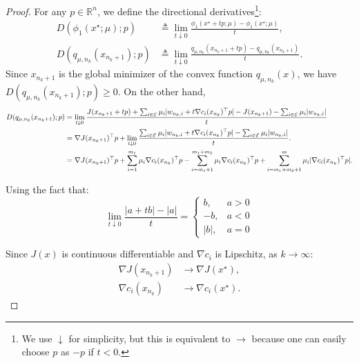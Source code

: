 \begin{proof}
    For any \( p \in \mathbb{R}^n \), we define the directional derivatives\footnote{We use $\downarrow$ for simplicity, but this is equivalent to $\rightarrow$ because one can easily choose $p$ as $-p$ if $t < 0$.}:
    \begin{align}
        D(\phi_1(x^\star;\mu);p) &\triangleq \lim_{t \downarrow 0} \frac{\phi_1(x^\star + tp;\mu) - \phi_1(x^\star;\mu)}{t}, \\
        D(q_{\mu,n_k}(x_{n_{k}+1});p) &\triangleq \lim_{t \downarrow 0} \frac{q_{\mu,n_k}(x_{n_{k}+1} + tp) - q_{\mu,n_k}(x_{n_{k}+1})}{t}.
    \end{align}
    Since $x_{n_k+1}$ is the global minimizer of the convex function $q_{\mu,n_k}(x)$, we have $D(q_{\mu,n_k}(x_{n_{k}+1});p) \geq 0$. On the other hand,
    \begin{align}
        D(q_{\mu,n_k}(x_{n_{k}+1});p) &= 
         \lim_{t \downarrow 0} \frac{J(x_{n_k+1} + tp) + \sum_{i\in {\cal E}}\mu_i| w_{n_k,i} + t\nabla c_i(x_{n_k})^\top p | - J(x_{n_k+1}) - \sum_{i\in {\cal E}}\mu_i| w_{n_k,i} |}{t} \\
        &= \nabla J(x_{n_k+1})^\top p + \lim_{t \downarrow 0} \frac{\sum_{i\in {\cal E}}\mu_i| w_{n_k,i} + t\nabla c_i(x_{n_k})^\top p | - \sum_{i\in {\cal E}}\mu_i| w_{n_k,i} |}{t}.\\
        & =  \nabla J(x_{n_k+1})^\top p + \sum_{i=1}^{m_1} \mu_i\nabla c_i(x_{n_k})^\top p 
         - \sum_{i=m_1+1}^{m_1+m_2} \mu_i\nabla c_i(x_{n_k})^\top p
        + \sum_{i=m_1+m_2+1}^{m} \mu_i|\nabla c_i(x_{n_k})^\top p|.\\
    \end{align}

    Using the fact that:
    \begin{equation}
        \lim_{t \downarrow 0} \frac{| a + tb | - | a |}{t} = \begin{cases}
            b, & a > 0 \\
            -b, & a < 0 \\
            |b|, & a = 0
        \end{cases}
    \end{equation}
    
    Since $J(x)$ is continuous differentiable and $\nabla c_i$ is Lipschitz, as $k \to \infty$:
    \begin{align}
        \nabla J(x_{n_k+1}) &\to \nabla J(x^\star), \\
        \nabla c_i(x_{n_k}) &\to \nabla c_i(x^\star).
    \end{align}
    

\end{proof}
